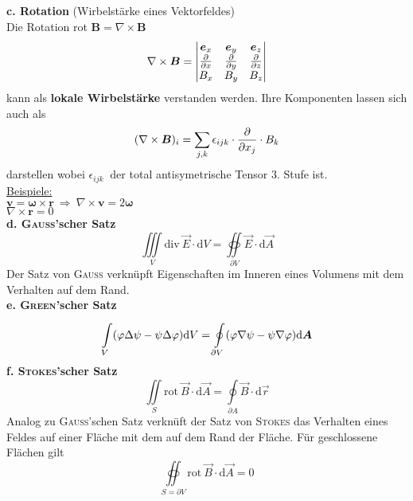 \linebreak
\textbf{c. Rotation} (Wirbelstärke eines Vektorfeldes)\\
\linebreak
Die Rotation rot $\bm{B}=\nabla\times\bm{B}$
\begin{equation*}
\nabla\times\bm{B}=\begin{vmatrix}
\bm{e}_x & \bm{e}_y & \bm{e}_z \\
\frac{\partial{}}{\partial{x}} & \frac{\partial{}}{\partial{y}} & \frac{\partial{}}{\partial{z}}\\
B_x & B_y & B_z
\end{vmatrix}
\end{equation*}
kann als \textbf{lokale Wirbelstärke} verstanden werden. Ihre Komponenten lassen sich auch als
\begin{equation*}
(\nabla\times\bm{B})_i=\sum\limits_{j,k}\epsilon_{ijk}\cdot\frac{\partial{}}{\partial{x_j}}\cdot B_k
\end{equation*}
darstellen wobei $\epsilon_{ijk}\ $ der total antisymetrische Tensor 3. Stufe ist.\\
\linebreak
\underline{Beispiele:}\\
\linebreak
$\bm{v}=\bm{\omega}\times\bm{r} \ \Rightarrow \ \nabla\times\bm{v}=2\bm{\omega}$\\
$\nabla\times\bm{r}=0$\\
\linebreak\linebreak
\textbf{d. \textsc{Gauss}'scher Satz}\\
\begin{equation*}
\iiint\limits_V\mathrm{div\ }\vec{E}\cdot\mathrm{d}V=\oiint\limits_{\partial V}\vec{E}\cdot\mathrm{d}\vec{A}
\end{equation*}
Der Satz von \textsc{Gauss} verknüpft Eigenschaften im Inneren eines Volumens mit dem Verhalten auf dem Rand.\\
\linebreak
\textbf{e. \textsc{Green}'scher Satz}\\
\begin{equation*}
\int\limits_{V}^{} (\varphi\Delta\psi-\psi\Delta\varphi) \mathrm{d} V=\oint\limits_{\partial V}^{} (\varphi\nabla\psi-\psi\nabla\varphi) \mathrm{d} \bm{A}
\end{equation*}
\linebreak
\textbf{f. \textsc{Stokes}'scher Satz}\\
\begin{equation*}
\iint\limits_S\mathrm{rot\ }\vec{B}\cdot\mathrm{d}\vec{A}=\oint\limits_{\partial A}\vec{B}\cdot\mathrm{d}\vec{r}
\end{equation*}
Analog zu \textsc{Gauss}'schen Satz verknüft der Satz von \textsc{Stokes} das Verhalten eines Feldes auf einer Fläche mit dem auf dem Rand der Fläche. Für geschlossene Flächen gilt
\begin{equation*}
\oiint\limits_{S=\partial V}\mathrm{rot\ }\vec{B}\cdot\mathrm{d}\vec{A}=0
\end{equation*}
